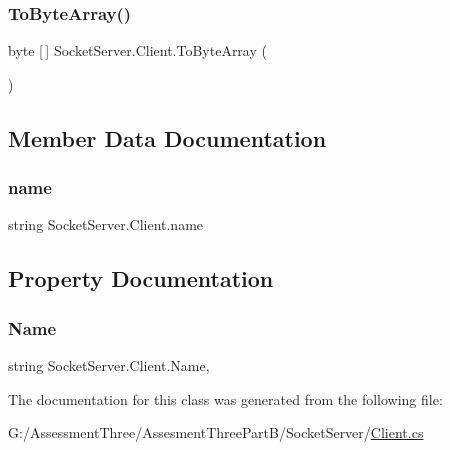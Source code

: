 \subsubsection{\texorpdfstring{To\+Byte\+Array()}{ToByteArray()}}
{\footnotesize\ttfamily byte \mbox{[}$\,$\mbox{]} Socket\+Server.\+Client.\+To\+Byte\+Array (\begin{DoxyParamCaption}{ }\end{DoxyParamCaption})\hspace{0.3cm}{\ttfamily [inline]}}



\subsection{Member Data Documentation}
\mbox{\label{class_socket_server_1_1_client_a9ba578b775f1217d70b08e344c279a8d}} 
\subsubsection{\texorpdfstring{name}{name}}
{\footnotesize\ttfamily string Socket\+Server.\+Client.\+name\hspace{0.3cm}{\ttfamily [private]}}



\subsection{Property Documentation}
\mbox{\label{class_socket_server_1_1_client_a239b5f307dd71e70bb2d90eaa0d6f88c}} 
\subsubsection{\texorpdfstring{Name}{Name}}
{\footnotesize\ttfamily string Socket\+Server.\+Client.\+Name\hspace{0.3cm}{\ttfamily [get]}, {\ttfamily [set]}}



The documentation for this class was generated from the following file\+:\begin{DoxyCompactItemize}
\item 
G\+:/\+Assessment\+Three/\+Assesment\+Three\+Part\+B/\+Socket\+Server/\hyperlink{_socket_server_2_client_8cs}{Client.\+cs}\end{DoxyCompactItemize}
